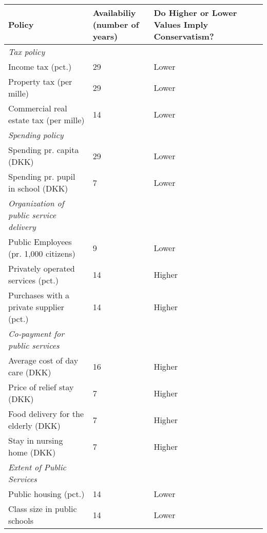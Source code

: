 \begin{table}[h]
	\centering \footnotesize
	\label{tab:policies} 
	\begin{tabular}{p{5.5cm}P{3cm}P{4.5cm}} \hline
		\textbf{Policy}                          & \textbf{Availabiliy \newline (number of years)} & \textbf{Do Higher or Lower Values Imply Conservatism?} \\
		\hline
	 \textit{Tax policy} &&\\
		Income tax (pct.)                        & 29     &    Lower       \\
		Property tax (per mille)                      & 29    &    Lower        \\
		Commercial real estate tax (per mille) & 14    &    Lower               \\ \hline
	
	 \textit{Spending policy}  &&\\
		Spending pr. capita (DKK)                & 29    &    Lower        \\
		Spending pr. pupil in school (DKK)       & 7     &    Lower     \\ \hline
		
	\textit{Organization of public service delivery}  &&\\
 		Public Employees (pr. 1,000 citizens)	 & 9	  &	   Lower	     \\
 		Privately operated services  (pct.) &   14  &    Higher     \\
 		Purchases with a private supplier  (pct.)      & 14    &    Higher     \\ \hline
 	
 	 \textit{Co-payment for public services} &&\\   
		Average cost of day care (DKK)                  & 16    &    Higher     \\
		Price of relief stay (DKK)				 & 7	  &	   Higher	 \\
		Food delivery for the  elderly (DKK) & 7   &    Higher     \\
		Stay in nursing home (DKK)              & 7     &    Higher     \\ \hline
	
	 \textit{Extent of Public Services} &&\\ 
		Public housing (pct.)                    & 14     &    Lower               \\
		Class size in public schools	         & 14    &    Lower       \\
		\hline \hline
		\end{tabular}
\end{table} 